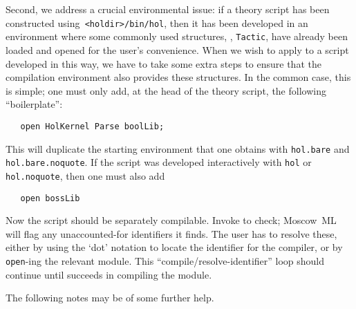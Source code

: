 Second, we address a crucial environmental issue: if a theory script
has been constructed using\verb+ <holdir>/bin/hol+, then it has been
developed in an environment where some commonly used structures, \eg,
\verb+Tactic+, have already been loaded and opened for the user's
convenience. When we wish to apply \holmake{} to a script developed
in this way, we have to take some extra steps to ensure that the
compilation environment also provides these structures.  In the common
case, this is simple; one must only add, at the head of the theory
script, the following ``boilerplate'':
\begin{verbatim}
   open HolKernel Parse boolLib;
\end{verbatim}
This will duplicate the starting environment that one obtains with
\verb+hol.bare+ and \linebreak \verb+hol.bare.noquote+.  If the script was
developed interactively with \texttt{hol} or \texttt{hol.noquote},
then one must also add
\begin{verbatim}
   open bossLib
\end{verbatim}
Now the script should be separately compilable. Invoke \holmake{}
to check; Moscow~ML will flag any unaccounted-for identifiers it finds.
The user has to resolve these, either by using the `dot' notation to
locate the identifier for the compiler, or by \verb+open+-ing the
relevant module. This ``compile/resolve-identifier'' loop should
continue until \holmake{} succeeds in compiling the module.

The following notes may be of some further help.


